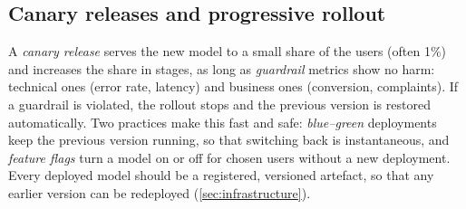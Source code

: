 \subsection{Canary releases and progressive rollout}

A \emph{canary release} serves the new model to a small share of the users (often 1\%) and increases the share in stages,
as long as \emph{guardrail} metrics show no harm: technical ones (error rate, latency) and business ones (conversion,
complaints). If a guardrail is violated, the rollout stops and the previous version is restored automatically. Two practices
make this fast and safe: \emph{blue--green} deployments keep the previous version running, so that switching back is
instantaneous, and \emph{feature flags} turn a model on or off for chosen users without a new deployment. Every deployed
model should be a registered, versioned artefact, so that any earlier version can be redeployed
(\cref{sec:infrastructure}).

